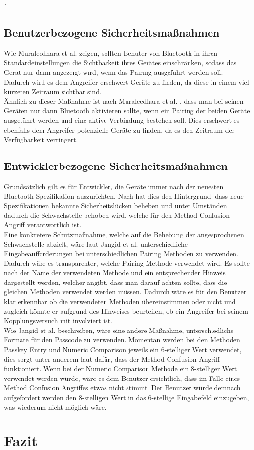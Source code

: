 ´\documentclass[
    a4paper,
    pagesize,
    pdftex,
    12pt,
]{scrartcl}
\begin{document}
\subsection{Benutzerbezogene Sicherheitsmaßnahmen}
    Wie Muraleedhara et al. \cite{bluetooth_newest_security_risks} zeigen, sollten Benuter von Bluetooth in ihren Standardeinstellungen die Sichtbarkeit ihres Gerätes einschränken, sodass das Gerät nur dann angezeigt wird, wenn das Pairing ausgeführt werden soll. Dadurch wird es dem Angreifer erschwert Geräte zu finden, da diese in einem viel kürzeren Zeitraum sichtbar sind. \\
    Ähnlich zu dieser Maßnahme ist nach Muraleedhara et al. \cite{bluetooth_newest_security_risks}, dass man bei seinen Geräten nur dann Bluetooth aktivieren sollte, wenn ein Pairing der beiden Geräte ausgeführt werden und eine aktive Verbindung bestehen soll. Dies erschwert es ebenfalls dem Angreifer potenzielle Geräte zu finden, da es den Zeitraum der Verfügbarkeit verringert.
\subsection{Entwicklerbezogene Sicherheitsmaßnahmen}
    Grundsätzlich gilt es für Entwickler, die Geräte immer nach der neuesten Bluetooth Spezifikation auszurichten. Nach \cite{bluetooth_newest_security_risks} hat dies den Hintergrund, dass neue Spezifikationen bekannte Sicherheitslücken beheben und unter Umständen dadurch die Schwachstelle behoben wird, welche für den Method Confusion Angriff verantwortlich ist. \\
    Eine konkretere Schutzmaßnahme, welche auf die Behebung der angesprochenen Schwachstelle abzielt, wäre laut Jangid et al. \cite{bluetooth_formal_analysis} unterschiedliche Eingabeaufforderungen bei unterschiedlichen Pairing Methoden zu verwenden. Dadurch wäre es transparenter, welche Pairing Methode verwendet wird. Es sollte nach \cite{bluetooth_formal_analysis}  der Name der verwendeten Methode und ein entsprechender Hinweis dargestellt werden, welcher angibt, dass man darauf achten sollte, dass die gleichen Methoden verwendet werden müssen. Dadurch wäre es für den Benutzer klar erkennbar ob die verwendeten Methoden übereinstimmen oder nicht und zugleich könnte er aufgrund des Hinweises beurteilen, ob ein Angreifer bei seinem Kopplungsversuch mit involviert ist. \\
    Wie Jangid et al. \cite{bluetooth_formal_analysis} beschreiben, wäre eine andere Maßnahme, unterschiedliche Formate für den Passcode zu verwenden. Momentan werden bei den Methoden Passkey Entry und Numeric Comparison jeweils ein 6-stelliger Wert verwendet, dies sorgt unter anderem laut \cite{bluetooth_formal_analysis} dafür, dass der Method Confusion Angriff funktioniert. Wenn bei der Numeric Comparison Methode ein 8-stelliger Wert verwendet werden würde, wäre es dem Benutzer ersichtlich, dass im Falle eines Method Confusion Angriffes etwas nicht stimmt. Der Benutzer würde demnach aufgefordert werden den 8-stelligen Wert in das 6-stellige Eingabefeld einzugeben, was wiederum nicht möglich wäre.
    
    \newpage
\section{Fazit}

    \newpage

    
    
\end{document}
